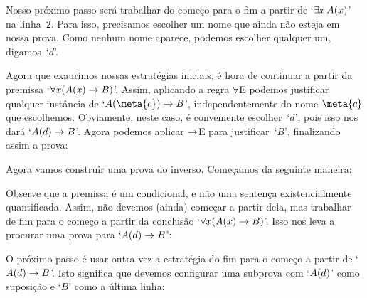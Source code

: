 \begin{fitchproof}
	\open
	\ellipsesline
	\close
\end{fitchproof}
Nosso pr\'oximo passo ser\'a trabalhar do come\c co para o fim a partir de `$\exists x\,\mathord{A}(x)$' na linha~$2$. Para isso, precisamos escolher um nome que ainda n\~ao esteja em nossa prova. Como nenhum nome aparece, podemos escolher qualquer um, digamos~`$d$'.
\begin{fitchproof}
	\open
	\open
	\ellipsesline
	\close
	\close
\end{fitchproof}
Agora que exaurimos nossas estrat\'egias iniciais,  \'e hora de continuar  a partir da premissa `$\forall x(\mathord{A}(x) \rightarrow B)$'. Assim, aplicando a regra $\forall$E podemos justificar qualquer inst\^ancia de `$A(\meta{c}) \eif B$', independentemente do nome $\meta{c}$ que escolhemos. Obviamente, neste caso, \'e conveniente  escolher~`$d$', pois isso nos dará  `$\mathord{A}(d) \rightarrow B$'. Agora podemos aplicar $\rightarrow$E para justificar~`$B$', finalizando assim a prova:

 
\begin{fitchproof}
	\open
	\open
	\close
	\close
\end{fitchproof}

Agora vamos construir uma prova do inverso. Come\c camos da seguinte maneira:
\begin{fitchproof}
	\ellipsesline
\end{fitchproof}
Observe que a premissa \'e um condicional, e n\~ao uma senten\c ca  existencialmente quantificada. Assim, n\~ao devemos (ainda) come\c car a partir  dela,  mas trabalhar de fim para o come\c co a partir da conclus\~ao `$\forall x(\mathord{A}(x) \rightarrow B)$'. Isso nos leva a procurar uma prova para `$\mathord{A}(d) \rightarrow B$':
\begin{fitchproof}
	\ellipsesline
\end{fitchproof}
O pr\'oximo passo \'e usar outra vez a estrat\'egia do fim para o come\c co a partir de  `$\mathord{A}(d) \rightarrow B$'.  Isto significa que devemos configurar uma subprova  com  `$\mathord{A}(d)$' como suposi\c c\~ao  e `$B$' como a \'ultima linha:  
 
